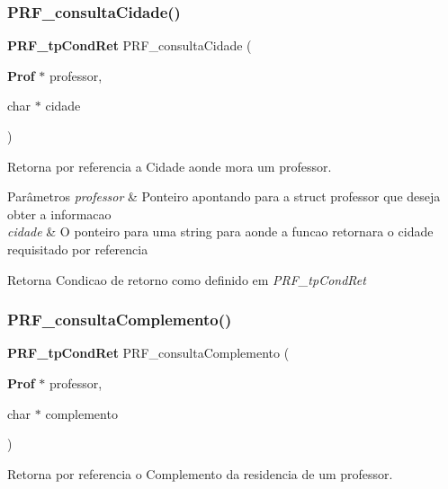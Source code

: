 \subsubsection{P\+R\+F\+\_\+consulta\+Cidade()}
{\footnotesize\ttfamily \textbf{ P\+R\+F\+\_\+tp\+Cond\+Ret} P\+R\+F\+\_\+consulta\+Cidade (\begin{DoxyParamCaption}\item[{\textbf{ Prof} $\ast$}]{professor,  }\item[{char $\ast$}]{cidade }\end{DoxyParamCaption})}



Retorna por referencia a Cidade aonde mora um professor. 


\begin{DoxyParams}{Parâmetros}
{\em professor} & Ponteiro apontando para a struct professor que deseja obter a informacao \\
\hline
{\em cidade} & O ponteiro para uma string para aonde a funcao retornara o cidade requisitado por referencia \\
\hline
\end{DoxyParams}
\begin{DoxyReturn}{Retorna}
Condicao de retorno como definido em {\itshape P\+R\+F\+\_\+tp\+Cond\+Ret} 
\end{DoxyReturn}
\mbox{\label{group__modulo_professor_gab09104ea8ee52509a53b8d548441a120}} 
\subsubsection{P\+R\+F\+\_\+consulta\+Complemento()}
{\footnotesize\ttfamily \textbf{ P\+R\+F\+\_\+tp\+Cond\+Ret} P\+R\+F\+\_\+consulta\+Complemento (\begin{DoxyParamCaption}\item[{\textbf{ Prof} $\ast$}]{professor,  }\item[{char $\ast$}]{complemento }\end{DoxyParamCaption})}



Retorna por referencia o Complemento da residencia de um professor. 


